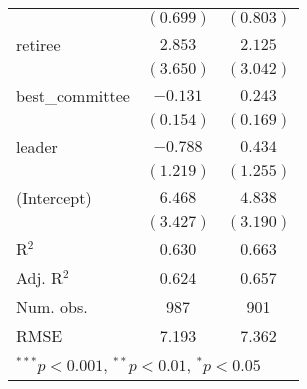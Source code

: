 \documentclass[12pt]{article}
\begin{document}
\begin{table}
\begin{center}
\begin{tabular}{l c c }
			& $(0.699)$      & $(0.803)$      \\
			retiree                  & $2.853$        & $2.125$        \\
			& $(3.650)$      & $(3.042)$      \\
			best\_committee          & $-0.131$       & $0.243$        \\
			& $(0.154)$      & $(0.169)$      \\
			leader                   & $-0.788$       & $0.434$        \\
			& $(1.219)$      & $(1.255)$      \\
			(Intercept)              & $6.468$        & $4.838$        \\
			& $(3.427)$      & $(3.190)$      \\
			\hline
			R$^2$                    & 0.630          & 0.663          \\
			Adj. R$^2$               & 0.624          & 0.657          \\
			Num. obs.                & 987            & 901            \\
			RMSE                     & 7.193          & 7.362          \\
			\hline
			\multicolumn{3}{l}{\scriptsize{$^{***}p<0.001$, $^{**}p<0.01$, $^*p<0.05$}}
		\end{tabular}
	\end{center}
\end{table}
\end{document}
